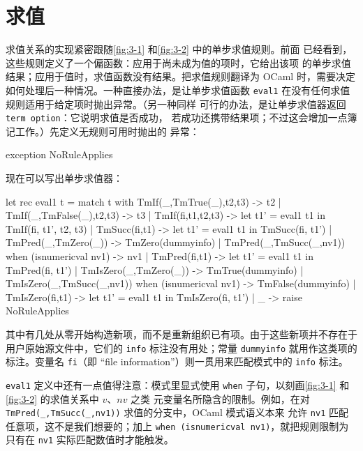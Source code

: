 \section{求值}
\label{sec:4.2}

求值关系的实现紧密跟随\cref{fig:3-1} 和\cref{fig:3-2} 中的单步求值规则。前面
已经看到，这些规则定义了一个偏函数：应用于尚未成为值的项时，它给出该项
的单步求值结果；应用于值时，求值函数没有结果。把求值规则翻译为 OCaml
时，需要决定如何处理后一种情况。一种直接办法，是让单步求值函数
\texttt{eval1} 在没有任何求值规则适用于给定项时抛出异常。（另一种同样
可行的办法，是让单步求值器返回 \texttt{term option}：它说明求值是否成功，
若成功还携带结果项；不过这会增加一点簿记工作。）先定义无规则可用时抛出的
异常：

\begin{taplocamlcode}
exception NoRuleApplies
\end{taplocamlcode}

现在可以写出单步求值器：

\begin{taplocamlcode}
let rec eval1 t = match t with
    TmIf(_,TmTrue(_),t2,t3) ->
      t2
  | TmIf(_,TmFalse(_),t2,t3) ->
      t3
  | TmIf(fi,t1,t2,t3) ->
      let t1' = eval1 t1 in
      TmIf(fi, t1', t2, t3)
  | TmSucc(fi,t1) ->
      let t1' = eval1 t1 in
      TmSucc(fi, t1')
  | TmPred(_,TmZero(_)) ->
      TmZero(dummyinfo)
  | TmPred(_,TmSucc(_,nv1)) when (isnumericval nv1) ->
      nv1
  | TmPred(fi,t1) ->
      let t1' = eval1 t1 in
      TmPred(fi, t1')
  | TmIsZero(_,TmZero(_)) ->
      TmTrue(dummyinfo)
  | TmIsZero(_,TmSucc(_,nv1)) when (isnumericval nv1) ->
      TmFalse(dummyinfo)
  | TmIsZero(fi,t1) ->
      let t1' = eval1 t1 in
      TmIsZero(fi, t1')
  | _ ->
      raise NoRuleApplies
\end{taplocamlcode}

其中有几处从零开始构造新项，而不是重新组织已有项。由于这些新项并不存在于
用户原始源文件中，它们的 \texttt{info} 标注没有用处；常量
\texttt{dummyinfo} 就用作这类项的标注。变量名 \texttt{fi}（即
“file information”）则一贯用来匹配模式中的 \texttt{info} 标注。

\texttt{eval1} 定义中还有一点值得注意：模式里显式使用 \texttt{when}
子句，以刻画\cref{fig:3-1} 和\cref{fig:3-2} 的求值关系中 \(v\)、\(nv\) 之类
元变量名所隐含的限制。例如，在对
\texttt{TmPred(\_,TmSucc(\_,nv1))} 求值的分支中，OCaml 模式语义本来
允许 \texttt{nv1} 匹配任意项，这不是我们想要的；加上
\texttt{when (isnumericval nv1)}，就把规则限制为只有在 \texttt{nv1}
实际匹配数值时才能触发。

